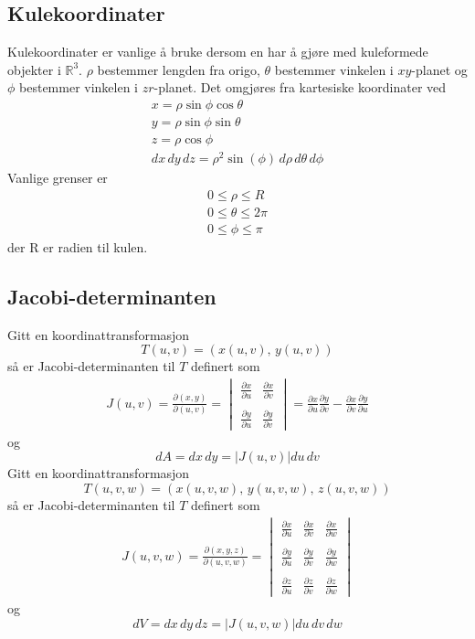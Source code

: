 \documentclass{article}
\begin{document}
\subsection{Kulekoordinater}
Kulekoordinater er vanlige å bruke dersom en har å gjøre med kuleformede objekter i $\mathbb{R}^3$. $\rho$ bestemmer lengden fra origo, $\theta$ bestemmer vinkelen i $xy$-planet og $\phi$ bestemmer vinkelen i $zr$-planet. Det omgjøres fra kartesiske koordinater ved
\begin{gather*}
    x = \rho\sin{\phi}\cos{\theta}\\
    y = \rho\sin{\phi}\sin{\theta}\\
    z = \rho\cos{\phi}\\
    dx\,dy\,dz = \rho^2\sin(\phi)\,d\rho\,d\theta\,d\phi
\end{gather*}
Vanlige grenser er
\begin{gather*}
    0 \leq \rho \leq R\\
    0 \leq \theta \leq 2\pi\\
    0 \leq \phi \leq \pi
\end{gather*}
der R er radien til kulen.


\subsection{Jacobi-determinanten}
Gitt en koordinattransformasjon
\[T(u, v) = (x(u, v),\,y(u, v))\]
så er Jacobi-determinanten til $T$ definert som
\begin{align*}
    J(u, v) = \frac{\partial (x, y)}{\partial (u, v)} =
    \begin{vmatrix}
        \frac{\partial x}{\partial u} & \frac{\partial x}{\partial v}\\\\
        \frac{\partial y}{\partial u} & \frac{\partial y}{\partial v}
    \end{vmatrix}
    = \frac{\partial x}{\partial u} \frac{\partial y}{\partial v} - \frac{\partial x}{\partial v} \frac{\partial y}{\partial u}
\end{align*}
og
\[dA = dx\,dy = \left| J(u, v) \right| du\,dv\]
Gitt en koordinattransformasjon
\[T(u, v, w) = (x(u, v, w),\,y(u, v, w),\,z(u, v, w))\]
så er Jacobi-determinanten til $T$ definert som
\begin{align*}
    J(u, v, w) = \frac{\partial (x, y, z)}{\partial (u, v, w)} =
    \begin{vmatrix}
        \frac{\partial x}{\partial u} & \frac{\partial x}{\partial v} & \frac{\partial x}{\partial w}\\\\
        \frac{\partial y}{\partial u} & \frac{\partial y}{\partial v} & \frac{\partial y}{\partial w}\\\\
        \frac{\partial z}{\partial u} & \frac{\partial z}{\partial v} & \frac{\partial z}{\partial w}
    \end{vmatrix}
\end{align*}
og
\[dV = dx\,dy\,dz = \left| J(u, v, w) \right| du\,dv\,dw\]
\end{document}
